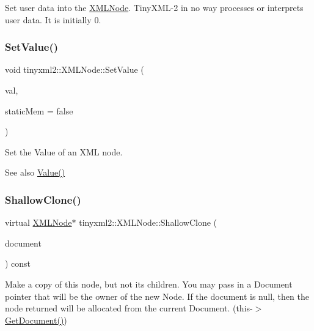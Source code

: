 Set user data into the \mbox{\hyperlink{classtinyxml2_1_1_x_m_l_node}{X\+M\+L\+Node}}. Tiny\+X\+M\+L-\/2 in no way processes or interprets user data. It is initially 0. \mbox{\label{classtinyxml2_1_1_x_m_l_node_a09dd68cf9eae137579f6e50f36487513}} 
\subsubsection{\texorpdfstring{Set\+Value()}{SetValue()}}
{\footnotesize\ttfamily void tinyxml2\+::\+X\+M\+L\+Node\+::\+Set\+Value (\begin{DoxyParamCaption}\item[{const char $\ast$}]{val,  }\item[{bool}]{static\+Mem = {\ttfamily false} }\end{DoxyParamCaption})}

Set the Value of an X\+ML node. \begin{DoxySeeAlso}{See also}
\mbox{\hyperlink{classtinyxml2_1_1_x_m_l_node_a0485e51c670e741884cfd8362274d680}{Value()}} 
\end{DoxySeeAlso}
\mbox{\label{classtinyxml2_1_1_x_m_l_node_a8402cbd3129d20e9e6024bbcc0531283}} 
\subsubsection{\texorpdfstring{Shallow\+Clone()}{ShallowClone()}}
{\footnotesize\ttfamily virtual \mbox{\hyperlink{classtinyxml2_1_1_x_m_l_node}{X\+M\+L\+Node}}$\ast$ tinyxml2\+::\+X\+M\+L\+Node\+::\+Shallow\+Clone (\begin{DoxyParamCaption}\item[{\mbox{\hyperlink{classtinyxml2_1_1_x_m_l_document}{X\+M\+L\+Document}} $\ast$}]{document }\end{DoxyParamCaption}) const\hspace{0.3cm}{\ttfamily [pure virtual]}}

Make a copy of this node, but not its children. You may pass in a Document pointer that will be the owner of the new Node. If the \textquotesingle{}document\textquotesingle{} is null, then the node returned will be allocated from the current Document. (this-\/$>$\mbox{\hyperlink{classtinyxml2_1_1_x_m_l_node_af343d1ef0b45c0020e62d784d7e67a68}{Get\+Document()}})


